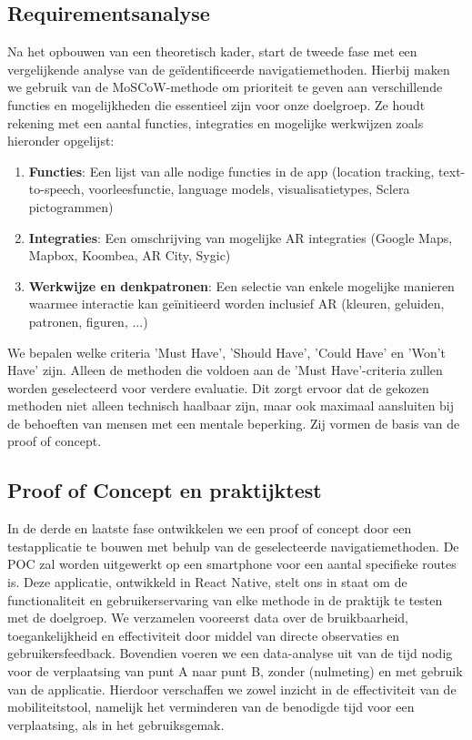 \subsection*{Requirementsanalyse}

Na het opbouwen van een theoretisch kader, start de tweede fase met een vergelijkende analyse van de geïdentificeerde navigatiemethoden. Hierbij maken we gebruik van de MoSCoW-methode om prioriteit te geven aan verschillende functies en mogelijkheden die essentieel zijn voor onze doelgroep. Ze houdt rekening met een aantal functies, integraties en mogelijke werkwijzen zoals hieronder opgelijst:

\begin{enumerate}
    \item \textbf{Functies}: Een lijst van alle nodige functies in de app (location tracking, text-to-speech, voorleesfunctie, language models, visualisatietypes, Sclera pictogrammen)
    \item \textbf{Integraties}: Een omschrijving van mogelijke AR integraties (Google Maps, Mapbox, Koombea, AR City, Sygic)
    \item \textbf{Werkwijze en denkpatronen}: Een selectie van enkele mogelijke manieren waarmee interactie kan geïnitieerd worden inclusief AR (kleuren, geluiden, patronen, figuren, ...)
\end{enumerate}
    
    We bepalen welke criteria 'Must Have', 'Should Have', 'Could Have' en 'Won't Have' zijn. Alleen de methoden die voldoen aan de 'Must Have'-criteria zullen worden geselecteerd voor verdere evaluatie. Dit zorgt ervoor dat de gekozen methoden niet alleen technisch haalbaar zijn, maar ook maximaal aansluiten bij de behoeften van mensen met een mentale beperking. Zij vormen de basis van de proof of concept.
    
    \subsection*{Proof of Concept en praktijktest}
    
    In de derde en laatste fase ontwikkelen we een proof of concept door een testapplicatie te bouwen met behulp van de geselecteerde navigatiemethoden. De POC zal worden uitgewerkt op een smartphone voor een aantal specifieke routes is. Deze applicatie, ontwikkeld in React Native, stelt ons in staat om de functionaliteit en gebruikerservaring van elke methode in de praktijk te testen met de doelgroep. We verzamelen vooreerst data over de bruikbaarheid, toegankelijkheid en effectiviteit door middel van directe observaties en gebruikersfeedback. Bovendien voeren we een data-analyse uit van de tijd nodig voor de verplaatsing van punt A naar punt B, zonder (nulmeting) en met gebruik van de applicatie. Hierdoor verschaffen we zowel inzicht in de effectiviteit van de mobiliteitstool, namelijk het verminderen van de benodigde tijd voor een verplaatsing, als in het gebruiksgemak.
    
